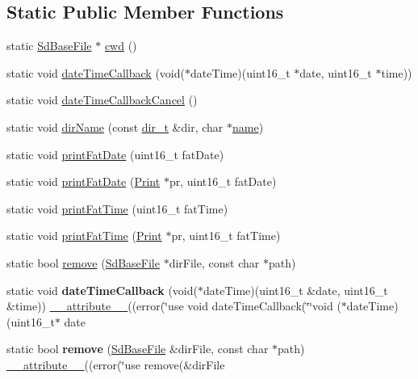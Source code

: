 \subsection*{Static Public Member Functions}
\begin{DoxyCompactItemize}
\item 
static \hyperlink{class_sd_base_file}{Sd\-Base\-File} $\ast$ \hyperlink{class_sd_base_file_a2c5568d41d6270faa79b89323ae63c6d}{cwd} ()
\item 
static void \hyperlink{class_sd_base_file_ae89cdf7331e346cc8b7ce4a935c5b3e5}{date\-Time\-Callback} (void($\ast$date\-Time)(uint16\-\_\-t $\ast$date, uint16\-\_\-t $\ast$time))
\item 
static void \hyperlink{class_sd_base_file_aa8e3adbe61ae1e665819aa0f56c50169}{date\-Time\-Callback\-Cancel} ()
\item 
static void \hyperlink{class_sd_base_file_ae2293f94f8ef9e6879265baf97d711c3}{dir\-Name} (const \hyperlink{_sd_fat_structs_8h_a803db59d4e16a0c54a647afc6a7954e3}{dir\-\_\-t} \&dir, char $\ast$\hyperlink{_sd_fat_structs_8h_a30308c9b983377042fd2cc8900454fb1}{name})
\item 
static void \hyperlink{class_sd_base_file_a4b0b63f35ecabac2d7fda5d0fe590fbb}{print\-Fat\-Date} (uint16\-\_\-t fat\-Date)
\item 
static void \hyperlink{class_sd_base_file_a946e3ce2fc487b22bd0c6535cf2579e8}{print\-Fat\-Date} (\hyperlink{class_print}{Print} $\ast$pr, uint16\-\_\-t fat\-Date)
\item 
static void \hyperlink{class_sd_base_file_a59fbc58803704c97e24cda953b62e271}{print\-Fat\-Time} (uint16\-\_\-t fat\-Time)
\item 
static void \hyperlink{class_sd_base_file_aee26cb9627fd22021d7dc068b835529d}{print\-Fat\-Time} (\hyperlink{class_print}{Print} $\ast$pr, uint16\-\_\-t fat\-Time)
\item 
static bool \hyperlink{class_sd_base_file_a6cba36958b2afc506e72376125cae511}{remove} (\hyperlink{class_sd_base_file}{Sd\-Base\-File} $\ast$dir\-File, const char $\ast$path)
\item 
\hypertarget{class_sd_base_file_af6a5d760094c8957e18a8d46d0abbee3}{static void {\bfseries date\-Time\-Callback} (void($\ast$date\-Time)(uint16\-\_\-t \&date, uint16\-\_\-t \&time)) \hyperlink{group__digital_pin_ga5589cd85aa7f8bf2b29ba1541eeb7103}{\-\_\-\-\_\-attribute\-\_\-\-\_\-}((error(\char`\"{}use void date\-Time\-Callback(\char`\"{}\char`\"{}void ($\ast$date\-Time)(uint16\-\_\-t$\ast$ date}\label{class_sd_base_file_af6a5d760094c8957e18a8d46d0abbee3}

\item 
\hypertarget{class_sd_base_file_a2691a24f7ba00f556e8320c28d1d5bed}{static bool {\bfseries remove} (\hyperlink{class_sd_base_file}{Sd\-Base\-File} \&dir\-File, const char $\ast$path) \hyperlink{group__digital_pin_ga5589cd85aa7f8bf2b29ba1541eeb7103}{\-\_\-\-\_\-attribute\-\_\-\-\_\-}((error(\char`\"{}use remove(\&dir\-File}\label{class_sd_base_file_a2691a24f7ba00f556e8320c28d1d5bed}

\end{DoxyCompactItemize}

